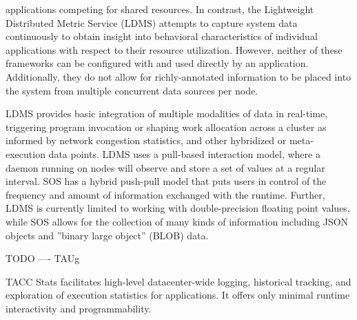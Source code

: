 applications competing for shared resources.
%
In contrast, the Lightweight Distributed Metric Service
\cite{agelastos2014lightweight} (LDMS) attempts to capture system data
continuously to obtain insight into behavioral characteristics of
individual applications with respect to their resource utilization.
%
%
However, neither of these frameworks can be configured with and used
directly by an application.
%
Additionally, they do not allow for richly-annotated information to be
placed into the system from multiple concurrent data sources per node.
%
\par
%
LDMS provides basic integration of multiple modalities of data in
real-time, triggering program invocation or shaping work allocation
across a cluster as informed by network congestion statistics, and
other hybridized or meta-execution data points.
%
LDMS uses a pull-based interaction model, where a daemon running on
nodes will observe and store a set of values at a regular interval.
%
SOS has a hybrid push-pull model that puts users in control of the
frequency and amount of information exchanged with the runtime.
%
Further, LDMS is currently limited to working with double-precision
floating point values, while SOS allows for the collection of many
kinds of information including JSON objects and ''binary large
object'' (BLOB) data.
%
\par
%
TODO ---- TAUg
%
\par
%
TACC Stats \cite{evans2014comprehensive} facilitates high-level
datacenter-wide logging, historical tracking, and exploration of
execution statistics for applications.  It offers only minimal
runtime interactivity and programmability.
%




